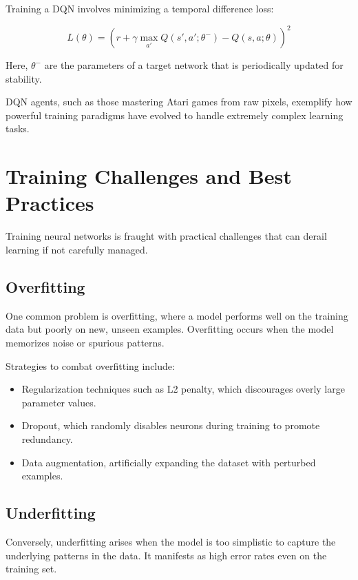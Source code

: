 \documentclass[openany]{book}
\begin{document}
Training a DQN involves minimizing a temporal difference loss:

\begin{equation}
L(\theta) = \left( r + \gamma \max_{a'} Q(s', 
a'; \theta^-) - Q(s, a; \theta) \right)^2
\end{equation}

Here, $\theta^-$ are the parameters of a target network that is periodically 
updated for stability.

DQN agents, such as those mastering Atari games from raw pixels, exemplify how 
powerful training paradigms have evolved to handle extremely complex learning 
tasks.

\section{Training Challenges and Best Practices}

Training neural networks is fraught with practical challenges that can derail 
learning if not carefully managed.

\subsection{Overfitting}

One common problem is overfitting, where a model performs well on the training 
data but poorly on new, unseen examples. Overfitting occurs when the model 
memorizes noise or spurious patterns.

Strategies to combat overfitting include:
\begin{itemize}
    \item Regularization techniques such as L2 penalty, which discourages overly
     large parameter values.
    \item Dropout, which randomly disables neurons during training to promote 
    redundancy.
    \item Data augmentation, artificially expanding the dataset with perturbed 
    examples.
\end{itemize}

\subsection{Underfitting}

Conversely, underfitting arises when the model is too simplistic to capture the 
underlying patterns in the data. It manifests as high error rates even on the 
training set.
\end{document}
